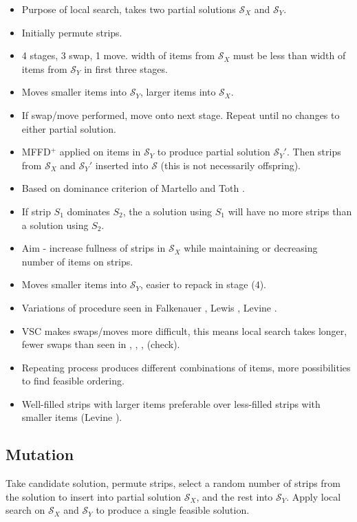 \documentclass{elsarticle}
\begin{document}
{\color{OrangeRed}
\begin{itemize}
	\item Purpose of local search, takes two partial solutions $\mathcal{S}_X$ and $\mathcal{S}_Y$.
	\item Initially permute strips.
	\item 4 stages, 3 swap, 1 move. width of items from $\mathcal{S}_X$ must be less than width of items from $\mathcal{S}_Y$ in first three stages.
	\item Moves smaller items into $\mathcal{S}_Y$, larger items into $\mathcal{S}_X$.
	\item If swap/move performed, move onto next stage. Repeat until no changes to either partial solution.
	\item MFFD$^+$ applied on items in $\mathcal{S}_Y$ to produce partial solution $\mathcal{S}_Y'$. Then strips from $\mathcal{S}_X$ and $\mathcal{S}_Y'$ inserted into $\mathcal{S}$ (this is not necessarily offspring).
	\item Based on dominance criterion of Martello and Toth \cite{martello1990l}.
	\item If strip $S_1$ dominates $S_2$, the a solution using $S_1$ will have no more strips than a solution using $S_2$.
	\item Aim - increase fullness of strips in $\mathcal{S}_X$ while maintaining or decreasing number of items on strips.
	\item Moves smaller items into $\mathcal{S}_Y$, easier to repack in stage (4).
	\item Variations of procedure seen in Falkenauer \cite{falkenauer1996}, Lewis \cite{lewis2009} \cite{lewis2017}, Levine \cite{levine2004}.
	\item VSC makes swaps/moves more difficult, this means local search takes longer, fewer swaps than seen in \cite{lewis2009}, \cite{lewis2017}, \cite{levine2004}, \cite{falkenauer1996} (check).
	\item Repeating process produces different combinations of items, more possibilities to find feasible ordering.
	\item Well-filled strips with larger items preferable over less-filled strips with smaller items (Levine \cite{levine2004}).
\end{itemize}
}


\subsection{Mutation}
\label{sub:mutation}
Take candidate solution, permute strips, select a random number of strips from the solution to insert into partial solution $\mathcal{S}_X$, and the rest into $\mathcal{S}_Y$. Apply local search on $\mathcal{S}_X$ and $\mathcal{S}_Y$ to produce a single feasible solution.
\end{document}
